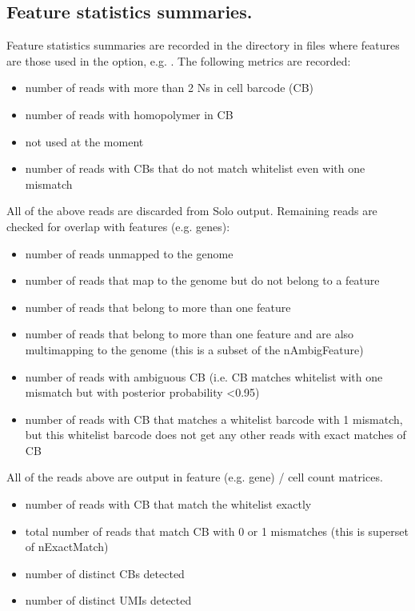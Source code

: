 \documentclass[12pt]{article}
\begin{document}
\subsection{Feature statistics summaries.}
Feature statistics summaries are recorded in the  directory in files  where  features are those used in the  option, e.g.  . The following metrics are recorded:
\begin{itemize}[leftmargin=1.5in]
	\itemsep -0.3em
	\item[\optv{nNinBarcode:}] number of reads with more than 2 Ns in cell barcode (CB)
	\item[\optv{nUMIhomopolymer:}] number of reads with homopolymer in CB 
	\item[\optv{nTooMany:}] not used at the moment
	\item[\optv{nNoMatch:}] number of reads with CBs that do not match whitelist even with one mismatch
\end{itemize}
All of the above reads are discarded from Solo output. Remaining reads are checked for overlap with features (e.g. genes):
\begin{itemize}[leftmargin=2in]
	\itemsep -0.3em
	\item[\optv{nUnmapped:}] number of reads unmapped to the genome
	\item[\optv{nNoFeature:}] number of reads that map to the genome but do not belong to a feature
	\item[\optv{nAmbigFeature:}] number of reads that belong to more than one feature
	\item[\optv{nAmbigFeatureMultimap:}] number of reads that belong to more than one feature and are also multimapping to the genome (this is a subset of the nAmbigFeature)
	\item[\optv{nTooMany:}] number of reads with ambiguous CB (i.e. CB matches whitelist with one mismatch but with posterior probability <0.95)
	\item[\optv{nNoExactMatch:}] number of reads with CB that matches a whitelist barcode with 1 mismatch, but this whitelist barcode does not get any other reads with exact matches of CB
\end{itemize}
All of the reads above are output in feature (e.g. gene) / cell count matrices.
\begin{itemize}[leftmargin=1.5in]
	\itemsep -0.3em
	\item[\optv{nExactMatch:}] number of reads with CB that match the whitelist exactly
	\item[\optv{nMatch:}] total number of reads that match CB with 0 or 1 mismatches (this is superset of nExactMatch)
	\item[\optv{nCellBarcodes:}] number of distinct CBs detected
	\item[\optv{nUMIs:}] number of distinct UMIs detected
\end{itemize}
\end{document}
